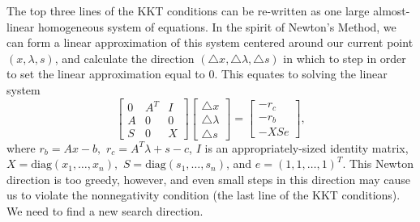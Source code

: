 The top three lines of the KKT conditions can be re-written as one large almost-linear homogeneous system of equations. 
In the spirit of
Newton's Method, we can form a linear approximation of this system centered around our current point $(x, \lambda, s)$, and
calculate the direction $(\triangle x, \triangle \lambda, \triangle s)$ in which to step in order to set the linear approximation
equal to 0. This equates to solving the linear system
\begin{equation}
\begin{bmatrix}
0 & A^T & I\\
A & 0 & 0\\
S & 0 & X
\end{bmatrix}
\begin{bmatrix}
\triangle x\\
\triangle \lambda\\
\triangle s
\end{bmatrix}
=
\begin{bmatrix}
-r_c\\
-r_b\\
-XSe
\end{bmatrix},
\label{eq:affine}
\end{equation}
where $r_b = Ax - b,$ $r_c = A^T\lambda + s - c$, $I$ is an appropriately-sized identity matrix, $X = \text{diag}(x_1,\ldots,x_n),$
$S = \text{diag}(s_1,\ldots,s_n)$, and $e = (1,1,\ldots,1)^T$.
This Newton direction is too greedy, however, and even small steps in this direction may cause us to violate the nonnegativity
condition (the last line of the KKT conditions). We need to find a new search direction.

